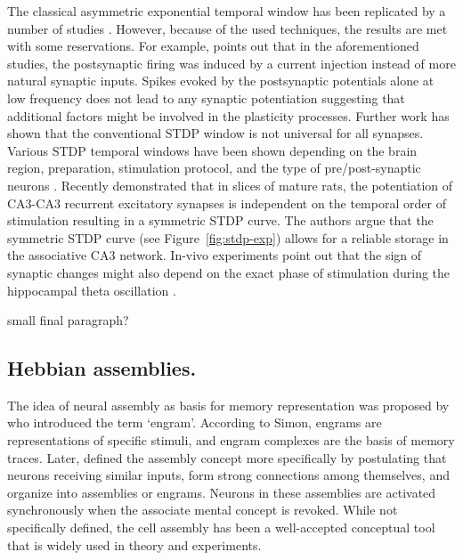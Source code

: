     The classical asymmetric exponential temporal window has been replicated by
    a number of studies \citep[e.g.,][]{Bi1998, Debanne1998, Zhang1998}.
    However, because of the used techniques, the results are met with some
    reservations. For example, \cite{Lisman2005} points out that in the
    aforementioned studies, the postsynaptic firing was induced by a current
    injection instead of more natural synaptic inputs. Spikes evoked by the
    postsynaptic potentials alone at low frequency does not lead to any
    synaptic potentiation \citep{Wittenberg2006} suggesting that additional
    factors might be involved in the plasticity processes. Further work has
    shown that the conventional STDP window \citep{Bi1998, Kempter1999} is not
    universal for all synapses. Various STDP temporal windows have been shown
    depending on the brain region, preparation, stimulation protocol, and the
    type of pre/post-synaptic neurons \citep{Feldman2012, Vogels2013}. Recently
    \cite{Mishra2016} demonstrated that in slices of mature rats, the
    potentiation of CA3-CA3 recurrent excitatory synapses is independent on the
    temporal order of stimulation resulting in a symmetric STDP curve. The
    authors argue that the symmetric STDP curve (see Figure~\ref{fig:stdp-exp})
    allows for a reliable storage in the associative CA3 network. In-vivo
    experiments point out that the sign of synaptic changes might also depend
    on the exact phase of stimulation during the hippocampal theta oscillation
    \citep{Hoelscher1997}.

    small final paragraph?

  \subsection{Hebbian assemblies.}
    The idea of neural assembly as basis for memory representation was proposed
    by \cite{Semon1904} who introduced the term `engram'. According to Simon,
    engrams are representations of specific stimuli, and engram complexes are the
    basis of memory traces. Later, \cite{Hebb49} defined the assembly concept
    more specifically by postulating that neurons receiving similar inputs, form
    strong connections among themselves, and organize into assemblies or engrams.
    Neurons in these assemblies are activated synchronously when the associate
    mental concept is revoked. While not specifically defined, the cell 
    assembly has been a well-accepted conceptual tool that is widely used 
    in theory and experiments.
   
